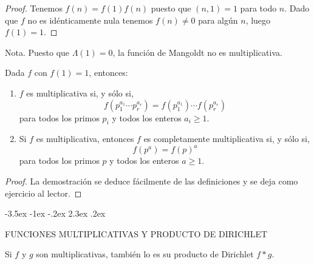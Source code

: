 \documentclass[12pt,a4paper]{book}
\makeatletter
\renewcommand\section{\@startsection{section}{1}{\z@}%
  {-3.5ex \@plus -1ex \@minus -.2ex}%
  {2.3ex \@plus .2ex}%
  {\normalfont\Large\bfseries\raggedright}}
\makeatother
\begin{document}
    \begin{proof}
        Tenemos $f(n)=f(1)f(n)$ puesto que $(n,1)=1$ para todo $n$. Dado que $f$ no es
        idénticamente nula tenemos $f(n)\neq0$ para algún $n$, luego $f(1)=1$.
    \end{proof}

    Nota. Puesto que $\Lambda(1)=0$, la función de Mangoldt no es multiplicativa.

    \begin{teorema}
        Dada $f$ con $f(1)=1$, entonces:
        \begin{enumerate}
            \item[(a)] $f$ es multiplicativa si, y sólo si,
            \begin{equation*}
                f(p_{1}^{a_{1}}\cdots p_{r}^{a_{r}})=f(p_{1}^{a_{1}})\cdots f(p_{r}^{a_{r}})
            \end{equation*}
            para todos los primos $p_{i}$ y todos los enteros $a_{i}\geq1$.
            \item[(b)] Si $f$ es multiplicativa, entonces $f$ es completamente
            multiplicativa si, y sólo si,
            \begin{equation*}
                f(p^{a})=f(p)^{a}
            \end{equation*}
            para todos los primos $p$ y todos los enteros $a\geq1$.
        \end{enumerate}
    \end{teorema}

    \begin{proof}
        La demostración se deduce fácilmente de las definiciones y se deja como ejercicio
        al lector.
    \end{proof}

    \section{FUNCIONES MULTIPLICATIVAS Y PRODUCTO DE DIRICHLET}
    \begin{teorema}
        Si $f$ y $g$ son multiplicativas, también lo es su producto de Dirichlet $f*g$.
    \end{teorema}
\end{document}

